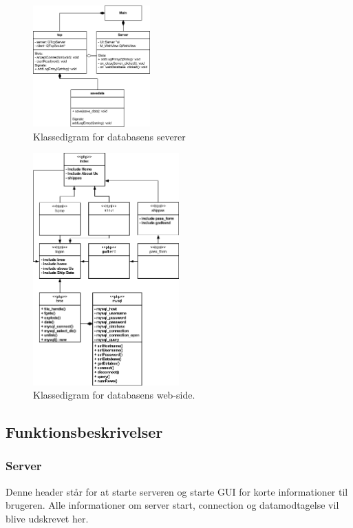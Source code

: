 \begin{figure}[htbp]
	\centering
	\includegraphics[width=0.4\textwidth]{billeder/serverKlassediagram}
	\caption{Klassedigram for databasens severer}
	\label{fig:serverKlassediagram}
\end{figure}

\begin{figure}[H]
	\centering
	\includegraphics[width=0.5\textwidth]{billeder/web_klasse}
	\caption{Klassedigram for databasens web-side.}
	\label{fig:serverKlassediagram}
\end{figure}


\subsection{Funktionsbeskrivelser}
\subsubsection{Server}
Denne header står for at starte serveren og starte GUI for korte informationer til brugeren. Alle informationer om server start, connection og datamodtagelse vil blive udskrevet her. 

